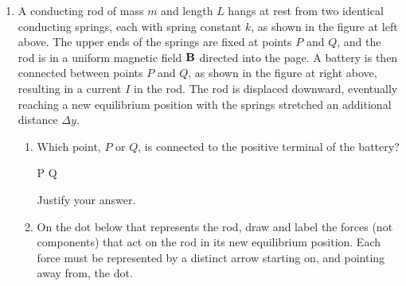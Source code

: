 \documentclass{../../../oss-classkick}
\begin{document}
\begin{enumerate}[leftmargin=15pt]
  \begin{center}
  \end{center}
\item A conducting rod of mass $m$ and length $L$ hangs at rest from two
  identical conducting springs, each with spring constant $k$, as shown in the
  figure at left above. The upper ends of the springs are fixed at points $P$
  and $Q$, and the rod is in a uniform magnetic field $\mathbf{B}$ directed into
  the page. A battery is then connected between points $P$ and $Q$, as shown in
  the figure at right above, resulting in a current $I$ in the rod. The rod is
  displaced downward, eventually reaching a new equilibrium position with the
  springs stretched an additional distance $\Delta y$.

  \begin{enumerate}
  \item Which point, $P$ or $Q$, is connected to the positive terminal of the
    battery?

    \underline{\hspace{.5in}} P\hspace{.3in}
    \underline{\hspace{.5in}} Q
    
    Justify your answer.
    \vspace{1in}
    
  \item On the dot below that represents the rod, draw and label the forces
    (not components) that act on the rod in its new equilibrium position. Each
    force must be represented by a distinct arrow starting on, and pointing away
    from, the dot.

    \vspace{.4in}
    \begin{center}
    \end{center}
    \vspace{.4in}
    

\end{enumerate}
\end{enumerate}
\end{document}
